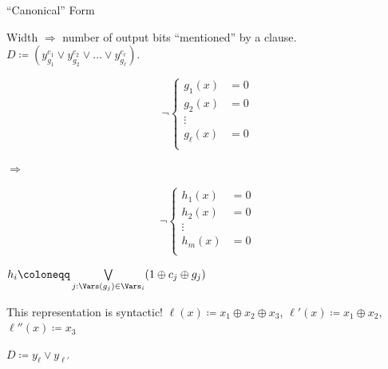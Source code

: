 \begin{frame}{``Canonical'' Form}

    Width $\Rightarrow$ number of output bits ``mentioned'' by a clause.
    $D \coloneqq (y^{c_1}_{g_1} \lor y^{c_2}_{g_2} \lor \dots \lor y^{c_{\ell}}_{g_{\ell}})$.

    \vspace{0.2cm}
    \pause
    \begin{minipage}[c]{0.45\linewidth}
        \begin{equation*}
            \neg \left\{
              \begin{aligned}
                  g_1(x) &= 0 \\
                  g_2(x) &= 0 \\
                  \vdots \\
                  g_{\ell}(x) &= 0 \\
              \end{aligned}
            \right.
        \end{equation*}
    \end{minipage}
    \pause
    \begin{minipage}[c]{0.05\linewidth}
        $\Rightarrow$
    \end{minipage}
    \begin{minipage}[c]{0.45\linewidth}
        \begin{equation*}
            \neg \left\{
              \begin{aligned}
                  h_1(x) &= 0 \\
                  h_2(x) &= 0 \\
                  \vdots \\
                  h_{m}(x) &= 0 \\
              \end{aligned}
            \right.
        \end{equation*}
    \end{minipage}

    \pause
    \vspace{0.2cm}
    $h_i \coloneqq \bigvee\limits_{j : \Vars(g_j) \in \Vars_i} (1 \oplus c_j \oplus g_j)$

    \pause
    \vspace{0.2cm}
    This representation is \alert{syntactic}!
    \pause
    $\ell(x) \coloneqq x_1 \oplus x_2 \oplus x_3$, $\ell'(x) \coloneqq x_1 \oplus x_2$, $\ell''(x)
    \coloneqq x_3$

    \pause
    \vspace{0.2cm}
    \begin{minipage}{0.15\linewidth}
        \centering
        
    \end{minipage}
    \begin{minipage}{0.4\linewidth}
        \centering
        $D \coloneqq y_{\ell} \lor y_{\ell'}$
        

\end{minipage}
\end{frame}
